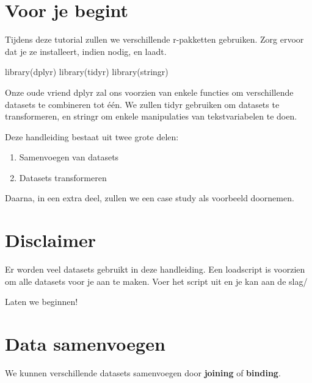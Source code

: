 \documentclass[]{tufte-book}
\newenvironment{Shaded}{}{}
\newcommand{\FunctionTok}[1]{\textcolor[rgb]{0.02,0.16,0.49}{#1}}
\newcommand{\NormalTok}[1]{#1}
\providecommand{\tightlist}{%
  \setlength{\itemsep}{0pt}\setlength{\parskip}{0pt}}
\begin{document}
\hypertarget{voor-je-begint-3}{%
\section{Voor je begint}\label{voor-je-begint-3}}

Tijdens deze tutorial zullen we verschillende r-pakketten gebruiken. Zorg ervoor dat je ze installeert, indien nodig, en laadt.

\begin{Shaded}
\begin{Highlighting}[]
\FunctionTok{library}\NormalTok{(dplyr)}
\FunctionTok{library}\NormalTok{(tidyr)}
\FunctionTok{library}\NormalTok{(stringr)}
\end{Highlighting}
\end{Shaded}

Onze oude vriend dplyr zal ons voorzien van enkele functies om verschillende datasets te combineren tot één. We zullen tidyr gebruiken om datasets te transformeren, en stringr om enkele manipulaties van tekstvariabelen te doen.

Deze handleiding bestaat uit twee grote delen:

\begin{enumerate}
\def\labelenumi{\arabic{enumi}.}
\tightlist
\item
  Samenvoegen van datasets
\item
  Datasets transformeren
\end{enumerate}

Daarna, in een extra deel, zullen we een case study als voorbeeld doornemen.

\hypertarget{disclaimer-1}{%
\section*{Disclaimer}\label{disclaimer-1}}

Er worden veel datasets gebruikt in deze handleiding. Een loadscript is voorzien om alle datasets voor je aan te maken. Voer het script uit en je kan aan de slag/

Laten we beginnen!

\hypertarget{data-samenvoegen}{%
\section{Data samenvoegen}\label{data-samenvoegen}}

We kunnen verschillende datasets samenvoegen door \textbf{joining} of \textbf{binding}.
\end{document}
